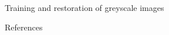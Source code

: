 \documentclass[25pt, a0paper, portrait]{beamer}
\newlength{\sepwidth}
\newlength{\colwidth}
\newcommand{\separatorcolumn}{\begin{column}{\sepwidth}\end{column}}
\begin{document}
\begin{frame}[t]
\begin{columns}[t]
\begin{column}{\colwidth}
\begin{block}{Training and restoration of greyscale images}
  \end{block}

  \begin{block}{References}
    \footnotesize{}

  \end{block}

\end{column}

\separatorcolumn
\end{columns}
\end{frame}
\end{document}
